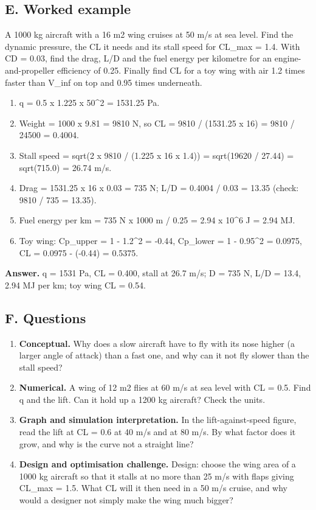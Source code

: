 \documentclass[11pt,a4paper]{article}
\begin{document}
\subsection*{E. Worked example}
A 1000 kg aircraft with a 16 m2 wing cruises at 50 m/s at sea level. Find the dynamic pressure, the CL it needs and its stall speed for CL\_max = 1.4. With CD = 0.03, find the drag, L/D and the fuel energy per kilometre for an engine-and-propeller efficiency of 0.25. Finally find CL for a toy wing with air 1.2 times faster than V\_inf on top and 0.95 times underneath.
\begin{enumerate}[nosep]
\item q = 0.5 x 1.225 x 50\textasciicircum{}2 = 1531.25 Pa.
\item Weight = 1000 x 9.81 = 9810 N, so CL = 9810 / (1531.25 x 16) = 9810 / 24500 = 0.4004.
\item Stall speed = sqrt(2 x 9810 / (1.225 x 16 x 1.4)) = sqrt(19620 / 27.44) = sqrt(715.0) = 26.74 m/s.
\item Drag = 1531.25 x 16 x 0.03 = 735 N; L/D = 0.4004 / 0.03 = 13.35 (check: 9810 / 735 = 13.35).
\item Fuel energy per km = 735 N x 1000 m / 0.25 = 2.94 x 10\textasciicircum{}6 J = 2.94 MJ.
\item Toy wing: Cp\_upper = 1 - 1.2\textasciicircum{}2 = -0.44, Cp\_lower = 1 - 0.95\textasciicircum{}2 = 0.0975, CL = 0.0975 - (-0.44) = 0.5375.
\end{enumerate}
\textbf{Answer.} q = 1531 Pa, CL = 0.400, stall at 26.7 m/s; D = 735 N, L/D = 13.4, 2.94 MJ per km; toy wing CL = 0.54.

\subsection*{F. Questions}
\begin{enumerate}[nosep]
\item \textbf{Conceptual.} Why does a slow aircraft have to fly with its nose higher (a larger angle of attack) than a fast one, and why can it not fly slower than the stall speed?
\item \textbf{Numerical.} A wing of 12 m2 flies at 60 m/s at sea level with CL = 0.5. Find q and the lift. Can it hold up a 1200 kg aircraft? Check the units.
\item \textbf{Graph and simulation interpretation.} In the lift-against-speed figure, read the lift at CL = 0.6 at 40 m/s and at 80 m/s. By what factor does it grow, and why is the curve not a straight line?
\item \textbf{Design and optimisation challenge.} Design: choose the wing area of a 1000 kg aircraft so that it stalls at no more than 25 m/s with flaps giving CL\_max = 1.5. What CL will it then need in a 50 m/s cruise, and why would a designer not simply make the wing much bigger?
\end{enumerate}
\end{document}
